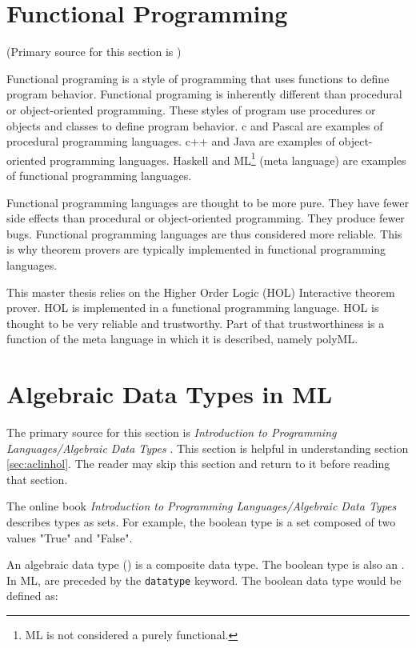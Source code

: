 \documentclass[../../main/main.tex]{subfiles}
\begin{document}
\section{Functional Programming}
(Primary source for this section is \cite{functionalprogramming})

Functional programing is a style of programming that uses functions to define program behavior.  Functional programing is inherently different than procedural or object-oriented programming. These styles of program use procedures or objects and classes to define program behavior.  c  and Pascal are examples of procedural programming languages.  c++ and Java are examples of object-oriented programming languages.  Haskell and ML\footnote{ML is not considered a purely functional.} (meta language) are examples of functional programming languages.  

Functional programming languages are thought to be more pure.  They have fewer side effects than procedural or object-oriented programming.  They produce fewer bugs.  Functional programming languages are thus considered more reliable. This is why theorem provers are typically implemented in functional programming languages.  

This master thesis relies on the Higher Order Logic (HOL) Interactive theorem prover.  HOL is implemented in a functional programming language.  HOL is thought to be very reliable and trustworthy.  Part of that trustworthiness is a function of the meta language in which it is described, namely polyML.

\section{Algebraic Data Types in ML}\label{adt}\label{sec:adtinml}
The primary source for this section is \textit{Introduction to Programming Languages/Algebraic  Data Types} \cite{types}.  This section is helpful in understanding section \ref{sec:aclinhol}.  The reader may skip this section and return to it before reading that section.

The online book \textit{Introduction to Programming Languages/Algebraic  Data Types} describes types as sets.  For example, the boolean type is a set composed of two values "True" and "False".  

An algebraic data type () is a composite data type.  The boolean type is also an .  In ML,  are preceded by the \texttt{datatype} keyword.  The boolean data type would be defined as:
\end{document}
